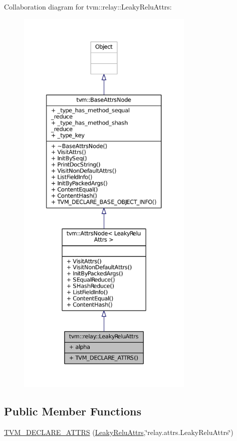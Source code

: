 Collaboration diagram for tvm\+:\+:relay\+:\+:Leaky\+Relu\+Attrs\+:
\nopagebreak
\begin{figure}[H]
\begin{center}
\leavevmode
\includegraphics[height=550pt]{structtvm_1_1relay_1_1LeakyReluAttrs__coll__graph}
\end{center}
\end{figure}
\subsection*{Public Member Functions}
\begin{DoxyCompactItemize}
\item 
\hyperlink{structtvm_1_1relay_1_1LeakyReluAttrs_aaf1863752a3f1dd0ba20d0658c009b48}{T\+V\+M\+\_\+\+D\+E\+C\+L\+A\+R\+E\+\_\+\+A\+T\+T\+RS} (\hyperlink{structtvm_1_1relay_1_1LeakyReluAttrs}{Leaky\+Relu\+Attrs},\char`\"{}relay.\+attrs.\+Leaky\+Relu\+Attrs\char`\"{})
\end{DoxyCompactItemize}
